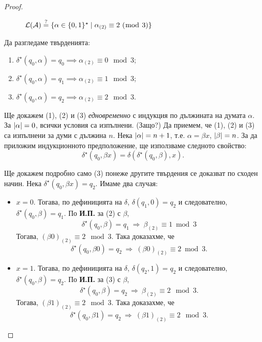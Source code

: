 \begin{proof}
\begin{framed}
\begin{figure}[H]
\begin{center}
      \end{center}
      \caption{$\L(\A) \stackrel{?}{=} \{\alpha\in\{0,1\}^\star \mid \alpha_{(2)} \equiv 2\ (\bmod\ 3)\}$}
 \end{figure}
 \end{framed}
 \noindent Да разгледаме твърденията:
 \begin{enumerate}[(1)]
  \item 
    $\delta^\star(q_0,\alpha) = q_0 \implies \alpha_{(2)} \equiv 0 \mod 3$;
  \item 
    $\delta^\star(q_0,\alpha) = q_1 \implies \alpha_{(2)} \equiv 1 \mod 3$;
  \item 
    $\delta^\star(q_0,\alpha) = q_2 \implies \alpha_{(2)} \equiv 2 \mod 3$.
  \end{enumerate}
  Ще докажем (1), (2) и (3) {\em едновременно} с индукция по дължината на думата $\alpha$.
  За $\lvert{\alpha}\rvert = 0$, всички условия са изпълнени. (Защо?)
  Да приемем, че (1), (2) и (3) са изпълнени за думи с дължина $n$.
  Нека $\lvert{\alpha}\rvert = n+1$, т.е. $\alpha = \beta x$, $\lvert{\beta}\rvert = n$.
  За да приложим индукционното предположение, ще използваме следното свойство:
  \[\delta^\star(q_0,\beta x) = \delta(\delta^\star(q_0,\beta),x).\]
  
  Ще докажем подробно само (3) понеже другите твърдения се доказват по сходен начин.
  Нека $\delta^\star(q_0,\beta x) = q_2$. 
  Имаме два случая:
  \begin{itemize}
  \item 
    $x = 0$. 
    Тогава, по дефиницията на $\delta$, 
    $\delta(q_1,0) = q_2$ и следователно, $\delta^\star(q_0,\beta) = q_1$.
    По {\bf И.П.} за (2) с $\beta$,
    \[\delta^\star(q_0,\beta) = q_1\ \Rightarrow\ \beta_{(2)} \equiv 1 \bmod 3\]
    Тогава, $(\beta0)_{(2)} \equiv 2 \mod 3$. Така доказахме, че
    \[\delta^\star(q_0,\beta 0) = q_2\ \Rightarrow\ (\beta 0)_{(2)} \equiv 2 \bmod 3.\]
  \item
    $x = 1$.
    Тогава, по дефиницията на $\delta$, $\delta(q_2,1) = q_2$ и следователно,
    $\delta^\star(q_0,\beta) = q_2$.
    По {\bf И.П.} за (3) с $\beta$,
    \[\delta^\star(q_0,\beta) = q_2\ \Rightarrow\ \beta_{(2)} \equiv 2 \mod 3.\]
    Тогава, $(\beta1)_{(2)} \equiv 2 \mod 3$. Така доказахме, че
    \[\delta^\star(q_0,\beta 1) = q_2\ \Rightarrow\ (\beta 1)_{(2)} \equiv 2 \mod 3.\]
  \end{itemize}
  

\end{proof}
